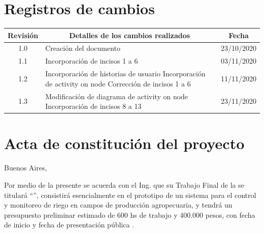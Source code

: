 \documentclass[11pt]{charter}
\begin{document}
\maketitle
\thispagestyle{empty}
\pagebreak


\thispagestyle{empty}
{\setlength{\parskip}{0pt}
\tableofcontents{}
}
\pagebreak


\section{Registros de cambios}
\label{sec:registro}


\begin{table}[ht]
\label{tab:registro}
\centering
\begin{tabularx}{\linewidth}{@{}|c|X|c|@{}}
\hline
\rowcolor[HTML]{C0C0C0} 
Revisión & \multicolumn{1}{c|}{\cellcolor[HTML]{C0C0C0}Detalles de los cambios realizados} & Fecha      \\ \hline
1.0      & Creación del documento                                          & 23/10/2020 \\ \hline
1.1      & Incorporación de incisos 1 a 6                                  & 03/11/2020 \\ \hline
1.2      & Incorporación de historias de usuario \newline
		   Incorporación de activity on node \newline 									   
		   Corrección de incisos 1 a 6                           & 11/11/2020 \\ \hline
1.3		 & Modificación de diagrama de activity on node\newline
		   Incorporación de incisos 8 a 13						 & 23/11/2020  \\ \hline  
\end{tabularx}
\end{table}

\pagebreak



\section{Acta de constitución del proyecto}
\label{sec:acta}

\begin{flushright}
Buenos Aires, \fechaInicioName
\end{flushright}

\vspace{2cm}

Por medio de la presente se acuerda con el Ing. \authorname\hspace{1px} que su Trabajo Final de la \degreename\hspace{1px} se titulará ``\ttitle'', consistirá esencialmente en el prototipo de un sistema para el control y monitoreo de riego en campos de producción agropecuaria, y tendrá un presupuesto preliminar estimado de 600 hs de trabajo y 400.000 pesos, con fecha de inicio \fechaInicioName\hspace{1px} y fecha de presentación pública \fechaFinalName.
\end{document}
